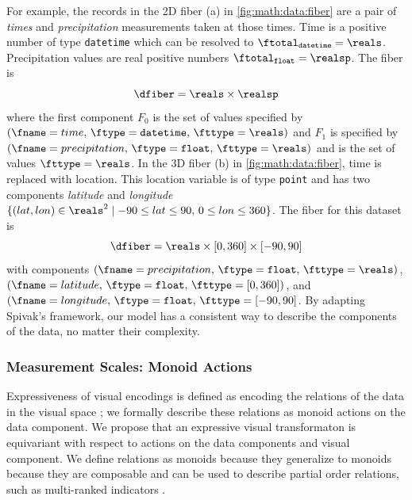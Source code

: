 \documentclass[../main.tex]{subfiles}
\begin{document}
For example, the records in the 2D fiber (a) in \autoref{fig:math:data:fiber} are a pair of \textit{times} and \textit{precipitation} measurements taken at those times. Time is a positive number of type \texttt{datetime} which can be resolved to $\ftotal_{\texttt{datetime}}= \reals$. Precipitation values are real positive numbers $\ftotal_{\texttt{float}} = \realsp$. The fiber is 
\begin{equation*}
    \dfiber =  \reals \times \realsp 
\end{equation*} 
where the first component $F_0$ is the set of values specified by $(\fname=time,\, \ftype=\texttt{datetime},\, \fttype=\reals)$ and $F_1$ is specified by $(\fname=precipitation,\, \ftype=\texttt{float},\, \fttype=\reals)$ and is the set of values $\fttype=\reals$. In the 3D fiber (b) in \autoref{fig:math:data:fiber}, time is replaced with location. This location variable is of type \texttt{point} and has two components \textit{latitude} and \textit{longitude} $\{(lat,lon) \in \reals^{2} \mid  -90\leq lat \leq 90,\, 0 \leq lon \leq 360\}$. The fiber for this dataset is
\begin{equation*}
    \dfiber = \reals \times \left[0, 360\right] \times \left[-90, 90\right]
\end{equation*} 
with components \((\fname=precipitation,\, \ftype=\texttt{float},\, \fttype=\reals)\), \((\fname=latitude,\, \ftype=\texttt{float}, \, \fttype=\left[0, 360\right])\), and \((\fname=longitude,\, \ftype=\texttt{float},\,\fttype= \left[-90, 90\right]\). By adapting Spivak's framework, our model has a consistent way to describe the components of the data, no matter their complexity. 

\subsubsection{Measurement Scales: Monoid Actions}
\label{sec:math:data:monoid}
Expressiveness of visual encodings is defined as encoding the relations of the data in the visual space \cite{mackinlayAutomatingDesignGraphical1986}; we formally describe these relations as monoid actions on the data component. We propose that an expressive visual transformaton is equivariant with respect to actions on the data components and visual component. We define relations as monoids because they generalize to monoids because they are composable \cite{yorgeyMonoidsThemeVariations} and can be used to describe partial order relations, such as multi-ranked indicators \cite{bruggemannRankingPrioritizationMultiindicator2011}.
\end{document}
